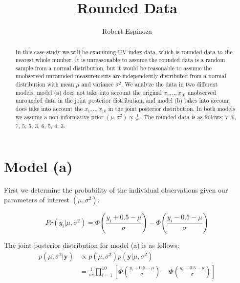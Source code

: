 \documentclass{asaproc}
\title{Rounded Data}
\author{Robert Espinoza}
\begin{document}
\maketitle


\begin{abstract}
In this case study we will be examining UV index data, which is rounded data to the nearest whole number.  It is unreasonable to assume the rounded data is a random sample from a normal distribution, but it would be reasonable to assume the unobserved unrounded measurements are independently distributed from a normal distribution with mean $\mu$ and variance $\sigma^2$.  We analyze the data in two different models, model (a) does not take into account the original $x_{1},..,x_{10}$ unobserved unrounded data in the joint posterior distribution, and model (b) takes into account does take into account the $x_{1},..,x_{10}$ in the joint posterior distribution.  In both models we assume a non-informative prior $(\mu,\sigma^2)\propto \frac{1}{\sigma^2}$.  The rounded data is as follows: 7, 6, 7, 5, 5, 3, 6, 5, 4, 3.
\end{abstract}


\section{Model (a)}

First we determine the probability of the individual observations given our parameters of interest $(\mu,\sigma^2)$.

\begin{equation*}
Pr(y_{i} | \mu,\sigma^2) = \Phi(\frac{y_{i}+0.5-\mu}{\sigma}) - \Phi(\frac{y_{i}-0.5-\mu}{\sigma})
\end{equation*}

The joint posterior distribution for model (a) is as follows:
\begin{align*}
p(\mu,\sigma^2 | \mathbf{y}) &\propto p(\mu,\sigma^2)p(\mathbf{y} | \mu,\sigma^2) \\
&= \frac{1}{\sigma^2}\prod_{i=1}^{10}[\Phi(\frac{y_{i}+0.5-\mu}{\sigma}) - \Phi(\frac{y_{i}-0.5-\mu}{\sigma})]
\end{align*}
\end{document}

